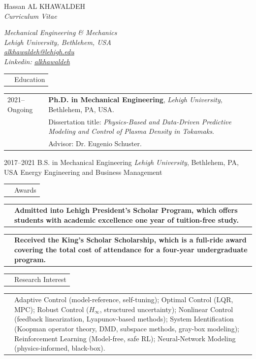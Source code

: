 \documentclass[11pt,letterpaper]{article}
\makeatletter
\newcommand{\CVHeader}{%
  \begin{minipage}[t]{0.62\textwidth}
    {\fontsize{28}{34}\selectfont\color{cvcolor} Hassan \textsc{AL KHAWALDEH}}\\[1.55em]
    {\fontsize{15}{18}\selectfont\itshape\color{cvcolor} Curriculum Vitae}
  \end{minipage}%
  \hfill
  \hspace{-2mm}
  \begin{minipage}[t]{0.34\textwidth}
    \raggedleft\small\itshape\color{cvcolor}
    Mechanical Engineering \& Mechanics\\
    Lehigh University, Bethlehem, USA\\[-1pt]
    \href{mailto:alkhawaldeh@lehigh.edu}{alkhawaldeh@lehigh.edu}\\[2pt]
     Linkedin: \href{https://www.linkedin.com/in/alkhawaldehh/}{alkhawaldeh}
  \end{minipage}
  \vspace{3.9em}
}
\newcommand{\CVSection}[1]{%
  \vspace{0.4em}
  \noindent
  \begin{tabularx}{\textwidth}{@{}p{0.82in}@{\hspace{0.14in}}X@{}}
    \raisebox{-1.45ex}{\color{rulecolor}\rule{0.82in}{4.2pt}} &
    {\fontsize{14}{16}\selectfont\color{cvcolor}#1}\\
  \end{tabularx}
  \vspace{0.55em}
}
\newcommand{\EducationEntry}[6]{%
  \begin{tabularx}{\textwidth}{@{}p{0.83in}@{\hspace{0.15in}}X@{}}
    \raggedleft #1 &
    \textbf{#2}, #3.\\[-1pt]
    & Dissertation title: {\itshape #4}.\\[-1pt]
    & Advisor: #5.\\[-1pt]
  \end{tabularx}
}
\newcommand{\UndergradEntry}[6]{%
  \begin{tabularx}{\textwidth}{@{}p{0.83in}@{\hspace{0.15in}}X@{}}
    \raggedleft #1 &
    \textbf{#2}, #3.\\[-1pt]
    & Minors: #4.\\[-1pt]
  \end{tabularx}
}
\newcommand{\CVItem}[2]{%
  \begin{tabularx}{\textwidth}{@{}p{0.83in}@{\hspace{0.15in}}X@{}}
    \raggedleft{#1} & #2\\[3pt]
  \end{tabularx}
}
\makeatother
\begin{document}
\CVHeader
\vspace{-10mm}

\CVSection{Education}

\EducationEntry
  {\hspace{-5mm}\mbox{2021--Ongoing}}
  {Ph.D. in Mechanical Engineering}
  {\textit{Lehigh University}, Bethlehem, PA, USA}
  {Physics-Based and Data-Driven Predictive Modeling and Control of Plasma Density in Tokamaks}
  {Dr. Eugenio Schuster}

\UndergradEntry
  {2017--2021}
  {B.S. in Mechanical Engineering}
  {\textit{Lehigh University}, Bethlehem, PA, USA}
  {Energy Engineering and Business Management}


\CVSection{Awards}

\CVItem{\hspace{-5mm}\mbox{2021}}{\textbf{Admitted into Lehigh President's Scholar Program, which offers students with academic excellence one year of tuition-free study.}}
\CVItem{\hspace{-5mm}\mbox{2017}}{\textbf{Received the King's Scholar Scholarship, which is a full-ride award covering the total cost of attendance for a four-year undergraduate program.}}
\CVSection{Research Interest}

\CVItem{Topics}{  Adaptive Control (model-reference, self-tuning);
  Optimal Control (LQR, MPC);
  Robust Control ($H_{\infty}$, structured uncertainty);
  Nonlinear Control (feedback linearization, Lyapunov-based methods);
  System Identification (Koopman operator theory, DMD, subspace methods, gray-box modeling);
  Reinforcement Learning (Model-free, safe RL);
  Neural-Network Modeling (physics-informed, black-box).}
\end{document}
